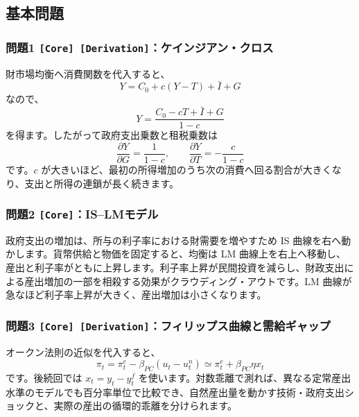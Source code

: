 \documentclass[
  japanese,
  lualatex,
  ja=standard,
  11pt,
  a4paper]{ltjsarticle}
\begin{document}
\subsection{基本問題}\label{ux57faux672cux554fux984c}

\subsubsection{\texorpdfstring{問題1
\texttt{{[}Core{]}\ {[}Derivation{]}}：ケインジアン・クロス}{問題1 {[}Core{]} {[}Derivation{]}：ケインジアン・クロス}}\label{ux554fux984c1-core-derivationux30b1ux30a4ux30f3ux30b8ux30a2ux30f3ux30afux30edux30b9}

財市場均衡へ消費関数を代入すると、 \[
Y=C_0+c(Y-T)+\bar I+G
\] なので、 \[
Y=\frac{C_0-cT+\bar I+G}{1-c}
\] を得ます。したがって政府支出乗数と租税乗数は \[
\frac{\partial Y}{\partial G}=\frac{1}{1-c},
\qquad
\frac{\partial Y}{\partial T}=-\frac{c}{1-c}
\] です。\(c\)
が大きいほど、最初の所得増加のうち次の消費へ回る割合が大きくなり、支出と所得の連鎖が長く続きます。

\subsubsection{\texorpdfstring{問題2
\texttt{{[}Core{]}}：IS--LMモデル}{問題2 {[}Core{]}：IS--LMモデル}}\label{ux554fux984c2-coreislmux30e2ux30c7ux30eb}

政府支出の増加は、所与の利子率における財需要を増やすため IS
曲線を右へ動かします。貨幣供給と物価を固定すると、均衡は LM
曲線上を右上へ移動し、産出と利子率がともに上昇します。利子率上昇が民間投資を減らし、財政支出による産出増加の一部を相殺する効果がクラウディング・アウトです。LM
曲線が急なほど利子率上昇が大きく、産出増加は小さくなります。

\subsubsection{\texorpdfstring{問題3
\texttt{{[}Core{]}\ {[}Derivation{]}}：フィリップス曲線と需給ギャップ}{問題3 {[}Core{]} {[}Derivation{]}：フィリップス曲線と需給ギャップ}}\label{ux554fux984c3-core-derivationux30d5ux30a3ux30eaux30c3ux30d7ux30b9ux66f2ux7ddaux3068ux9700ux7d66ux30aeux30e3ux30c3ux30d7}

オークン法則の近似を代入すると、 \[
\pi_t
=\pi_t^e-\beta_{PC}(u_t-u_t^n)
\simeq
\pi_t^e+\beta_{PC}\eta x_t
\] です。後続回では \(x_t=y_t-y_t^f\)
を使います。対数乖離で測れば、異なる定常産出水準のモデルでも百分率単位で比較でき、自然産出量を動かす技術・政府支出ショックと、実際の産出の循環的乖離を分けられます。
\end{document}
